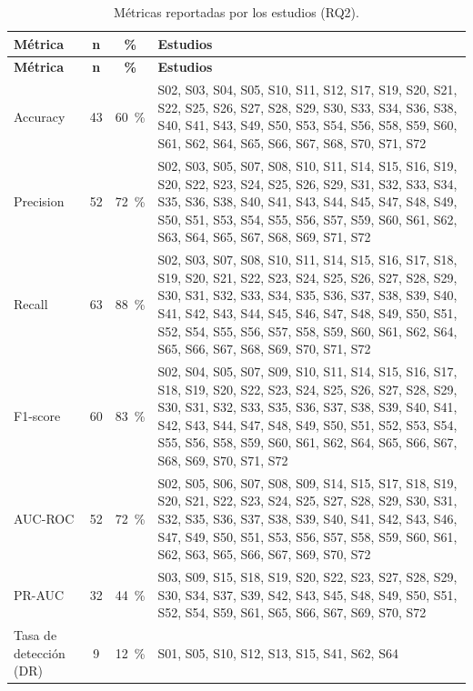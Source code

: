 \begingroup
\small
\begin{xltabular}{\linewidth}{lccX}
\caption{M\'{e}tricas reportadas por los estudios (RQ2).}\label{tab:metricas}\\
\toprule
\textbf{M\'{e}trica} & \textbf{n} & \textbf{\%} & \textbf{Estudios} \\
\midrule\endfirsthead
\toprule
\textbf{M\'{e}trica} & \textbf{n} & \textbf{\%} & \textbf{Estudios} \\
\midrule\endhead
\bottomrule\endfoot
Accuracy & 43 & 60~\% & S02, S03, S04, S05, S10, S11, S12, S17, S19, S20, S21, S22, S25, S26, S27, S28, S29, S30, S33, S34, S36, S38, S40, S41, S43, S49, S50, S53, S54, S56, S58, S59, S60, S61, S62, S64, S65, S66, S67, S68, S70, S71, S72 \\
Precision & 52 & 72~\% & S02, S03, S05, S07, S08, S10, S11, S14, S15, S16, S19, S20, S22, S23, S24, S25, S26, S29, S31, S32, S33, S34, S35, S36, S38, S40, S41, S43, S44, S45, S47, S48, S49, S50, S51, S53, S54, S55, S56, S57, S59, S60, S61, S62, S63, S64, S65, S67, S68, S69, S71, S72 \\
Recall & 63 & 88~\% & S02, S03, S07, S08, S10, S11, S14, S15, S16, S17, S18, S19, S20, S21, S22, S23, S24, S25, S26, S27, S28, S29, S30, S31, S32, S33, S34, S35, S36, S37, S38, S39, S40, S41, S42, S43, S44, S45, S46, S47, S48, S49, S50, S51, S52, S54, S55, S56, S57, S58, S59, S60, S61, S62, S64, S65, S66, S67, S68, S69, S70, S71, S72 \\
F1-score & 60 & 83~\% & S02, S04, S05, S07, S09, S10, S11, S14, S15, S16, S17, S18, S19, S20, S22, S23, S24, S25, S26, S27, S28, S29, S30, S31, S32, S33, S35, S36, S37, S38, S39, S40, S41, S42, S43, S44, S47, S48, S49, S50, S51, S52, S53, S54, S55, S56, S58, S59, S60, S61, S62, S64, S65, S66, S67, S68, S69, S70, S71, S72 \\
AUC-ROC & 52 & 72~\% & S02, S05, S06, S07, S08, S09, S14, S15, S17, S18, S19, S20, S21, S22, S23, S24, S25, S27, S28, S29, S30, S31, S32, S35, S36, S37, S38, S39, S40, S41, S42, S43, S46, S47, S49, S50, S51, S53, S56, S57, S58, S59, S60, S61, S62, S63, S65, S66, S67, S69, S70, S72 \\
PR-AUC & 32 & 44~\% & S03, S09, S15, S18, S19, S20, S22, S23, S27, S28, S29, S30, S34, S37, S39, S42, S43, S45, S48, S49, S50, S51, S52, S54, S59, S61, S65, S66, S67, S69, S70, S72 \\
Tasa de detecci\'{o}n (DR) & 9 & 12~\% & S01, S05, S10, S12, S13, S15, S41, S62, S64 \\

\end{xltabular}
